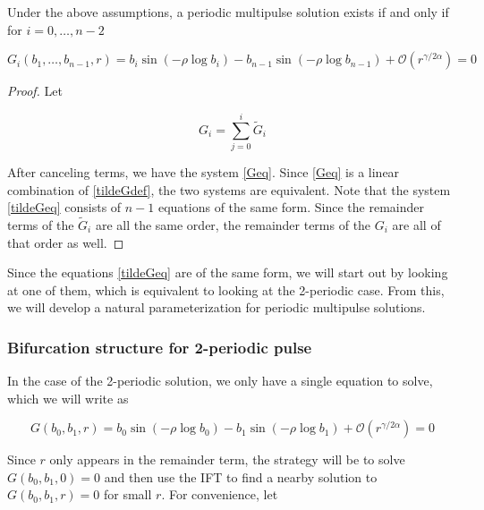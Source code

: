 \documentclass[thesis.tex]{subfiles}
\begin{document}
\begin{lemma}\label{diagonalG}
Under the above assumptions, a periodic multipulse solution exists if and only if for $i = 0, \dots, n-2$

\begin{equation}\label{Geq}
G_i(b_1, \dots, b_{n-1}, r) = b_i \sin \left( -\rho \log b_i \right) - b_{n-1} \sin \left( -\rho \log b_{n-1} \right) + \mathcal{O}(r^{\gamma / 2 \alpha}) = 0
\end{equation}

\begin{proof}

Let 

\begin{equation}\label{tildeGdef}
G_i = \sum_{j = 0}^i \tilde{G}_i
\end{equation}

After canceling terms, we have the system \eqref{Geq}. Since \eqref{Geq} is a linear combination of \eqref{tildeGdef}, the two systems are equivalent. Note that the system \eqref{tildeGeq} consists of $n-1$ equations of the same form. Since the remainder terms of the $\tilde{G}_i$ are all the same order, the remainder terms of the $G_i$ are all of that order as well.

\end{proof}
\end{lemma}

Since the equations \eqref{tildeGeq} are of the same form, we will start out by looking at one of them, which is equivalent to looking at the 2-periodic case. From this, we will develop a natural parameterization for periodic multipulse solutions.

\subsubsection{Bifurcation structure for 2-periodic pulse}

In the case of the 2-periodic solution, we only have a single equation to solve, which we will write as

\begin{equation}\label{Geq1}
G(b_0, b_1, r) = b_0 \sin \left( -\rho \log b_0 \right) - b_1 \sin \left( -\rho \log b_1 \right) + \mathcal{O}(r^{\gamma / 2 \alpha}) = 0
\end{equation}

Since $r$ only appears in the remainder term, the strategy will be to solve $G(b_0, b_1, 0) = 0$ and then use the IFT to find a nearby solution to $G(b_0, b_1, r) = 0$ for small $r$. For convenience, let
\end{document}

